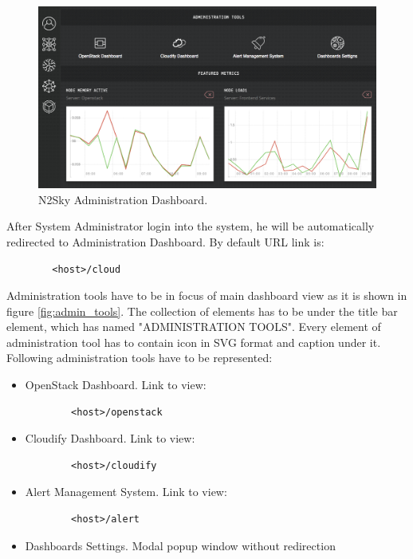 \begin{figure}[htbp]
\begin{center}
  \includegraphics[width=\linewidth]{components/4/pics/admin_dashboard.png}
  \caption{N2Sky Administration Dashboard.}
  \label{fig:admin_dashboard}
\end{center}
\end{figure}

After System Administrator login into the system, he will be automatically redirected to Administration Dashboard. By default URL link is:
\begin{lstlisting}
        <host>/cloud
\end{lstlisting}

Administration tools have to be in focus of main dashboard view as it is shown in figure \ref{fig:admin_tools}. The collection of elements has to be under the title bar element, which has named "ADMINISTRATION TOOLS". Every element of administration tool has to contain icon in SVG \cite{Cagle2005} format and caption under it. Following administration tools have to be represented: 
\begin{itemize}
\item OpenStack Dashboard. Link to view: 
\begin{lstlisting}
        <host>/openstack
\end{lstlisting}
\item Cloudify Dashboard. Link to view: 
\begin{lstlisting}
        <host>/cloudify
\end{lstlisting}
\item Alert Management System. Link to view: 
\begin{lstlisting}
        <host>/alert
\end{lstlisting}
\item Dashboards Settings. Modal popup window without redirection
\end{itemize}

